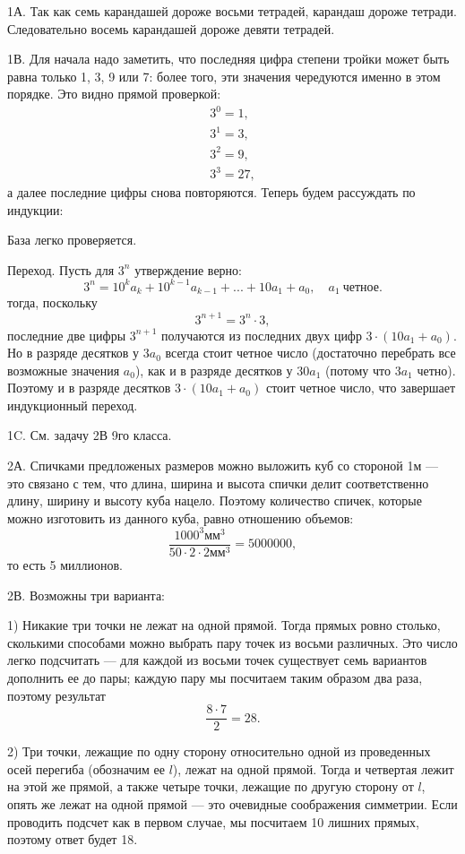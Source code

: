 \documentclass[12pt]{amsart}
\theoremstyle{definition}
\theoremstyle{remark}
\theoremstyle{plain}
\begin{document}
1А. Так как семь карандашей дороже восьми тетрадей, карандаш дороже тетради. Следовательно восемь карандашей дороже девяти тетрадей.

1В. Для начала надо заметить, что последняя цифра степени тройки может быть равна только 1, 3, 9 или 7: более того, эти значения чередуются именно в этом порядке. Это видно прямой проверкой:
$$
\begin{array}{l}
3^0=1,\\
3^1=3,\\
3^2=9,\\
3^3=27,
\end{array}
$$
а далее последние цифры снова повторяются. Теперь будем рассуждать по индукции:

База легко проверяется.

Переход. Пусть для $3^n$ утверждение верно:
$$
3^n=10^ka_k+10^{k-1}a_{k-1}+...+10a_1+a_0,\quad a_1\ \text{четное}.
$$
тогда, поскольку
$$
3^{n+1}=3^n\cdot 3,
$$
последние две цифры $3^{n+1}$ получаются из последних двух цифр $3\cdot (10a_1+a_0)$. Но в разряде десятков у $3a_0$ всегда стоит четное число (достаточно перебрать все возможные значения $a_0$), как и в разряде десятков у $30a_1$ (потому что $3a_1$ четно). Поэтому и в разряде десятков $3\cdot (10a_1+a_0)$ стоит четное число, что завершает индукционный переход.

1C. См. задачу 2В 9го класса.

2А. Спичками предложеных размеров можно выложить куб со стороной 1м --- это связано с тем, что длина, ширина и высота спички делит соответственно длину, ширину и высоту куба нацело. Поэтому количество спичек, которые можно изготовить из данного куба, равно отношению объемов:
$$
\frac{1000^3\text{мм}^3}{50\cdot 2\cdot 2\text{мм}^3}=5000000,
$$
то есть 5 миллионов.

2В. Возможны три варианта:

1) Никакие три точки не лежат на одной прямой. Тогда прямых ровно столько, сколькими способами можно выбрать пару точек из восьми различных. Это число легко подсчитать --- для каждой из восьми точек существует семь вариантов дополнить ее до пары; каждую пару мы посчитаем таким образом два раза, поэтому результат
$$
\frac{8\cdot 7}{2}=28.
$$

2) Три точки, лежащие по одну сторону относительно одной из проведенных осей перегиба (обозначим ее $l$), лежат на одной прямой. Тогда и четвертая лежит на этой же прямой, а также четыре точки, лежащие по другую сторону от $l$, опять же лежат на одной прямой --- это очевидные соображения симметрии. Если проводить подсчет как в первом случае, мы посчитаем 10 лишних прямых, поэтому ответ будет 18.
\end{document}
